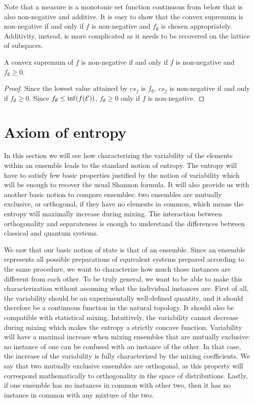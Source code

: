 Note that a measure is a monotonic set function continuous from below that is also non-negative and additive. It is easy to show that the convex supremum is non-negative if and only if $f$ is non-negative and $f_{\emptyset}$ is chosen appropriately. Additivity, instead, is more complicated as it needs to be recovered on the lattice of subspaces.

\begin{mathSection}
\begin{coro}
	A convex supremum of $f$ is non-negative if and only if $f$ is non-negative and $f_{\emptyset} \geq 0$.
\end{coro}
\begin{proof}
	Since the lowest value attained by $cs_f$ is $f_{\emptyset}$, $cs_f$ is non-negative if and only if $f_{\emptyset} \geq 0$. Since $f_{\emptyset} \leq \inf(f(\mathcal{E}))$, $f_{\emptyset} \geq 0$ only if $f$ is non-negative.
\end{proof}
\end{mathSection}

\section{Axiom of entropy}

In this section we will see how characterizing the variability of the elements within an ensemble leads to the standard notion of entropy. The entropy will have to satisfy few basic properties justified by the notion of variability which will be enough to recover the usual Shannon formula. It will also provide us with another basic notion to compare ensembles: two ensembles are mutually exclusive, or orthogonal, if they have no elements in common, which means the entropy will maximally increase during mixing. The interaction between orthogonality and separateness is enough to understand the differences between classical and quantum systems.

We saw that our basic notion of state is that of an ensemble. Since an ensemble represents all possible preparations of equivalent systems prepared according to the same procedure, we want to characterize how much those instances are different from each other. To be truly general, we want to be able to make this characterization without assuming what the individual instances are. First of all, the variability should be an experimentally well-defined quantity, and it should therefore be a continuous function in the natural topology. It should also be compatible with statistical mixing. Intuitively, the variability cannot decrease during mixing which makes the entropy a strictly concave function. Variability will have a maximal increase when mixing ensembles that are mutually exclusive: no instance of one can be confused with an instance of the other. In that case, the increase of the variability is fully characterized by the mixing coefficients. We say that two mutually exclusive ensembles are orthogonal, as this property will correspond mathematically to orthogonality in the space of distributions. Lastly, if one ensemble has no instances in common with other two, then it has no instance in common with any mixture of the two.

